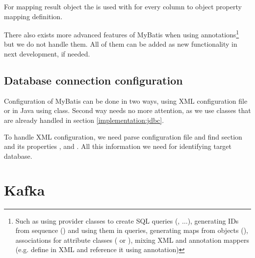 For mapping result object the  is used with 
for every column to object property mapping definition.


There also exists more advanced features of MyBatis when using annotations\footnote{
  Such as using provider classes to create SQL queries (, $\ldots$),
  generating IDs from sequence () and using them in queries,
  generating maps from objects (),
  associations for attribute classes ( or ),
  mixing XML and annotation mappers (e.g. define  in XML and reference it
  using  annotation)}
but we do not handle them. All of them can be added as new functionality in next development,
if needed.




\subsection{Database connection configuration}

Configuration of MyBatis can be done in two ways, using XML configuration file
or in Java using  class. Second way needs no more attention,
as we use  classes that are already handled in section \ref{implementation:jdbc}.

To handle XML configuration, we need parse configuration file and find 
section and its properties ,  and . All this
information we need for identifying target database.



\section{Kafka}


